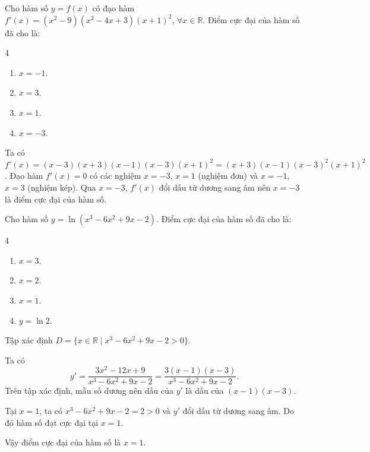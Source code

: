 \begin{baitap}
	Cho hàm số $y = f(x)$ có đạo hàm $f'(x) = (x^2 - 9)(x^2 - 4x + 3)(x + 1)^2$, $\forall x \in \mathbb{R}$. Điểm cực đại của hàm số đã cho là:
	\begin{multicols}{4}
		\begin{enumerate}
			\item $x = -1$.
			\item $x = 3$.
			\item $x = 1$.
			\item $x = -3$.
		\end{enumerate}
	\end{multicols}
	\begin{traloi}
		Ta có $f'(x) = (x - 3)(x + 3)(x - 1)(x - 3)(x + 1)^2 = (x + 3)(x - 1)(x - 3)^2(x + 1)^2$.
		Đạo hàm $f'(x) = 0$ có các nghiệm $x = -3$, $x = 1$ (nghiệm đơn) và $x = -1$, $x = 3$ (nghiệm kép).
		Qua $x = -3$, $f'(x)$ đổi dấu từ dương sang âm nên $x = -3$ là điểm cực đại của hàm số.
	\end{traloi}
	\end{baitap}
\begin{baitap}
	Cho hàm số $y = \ln(x^3 - 6x^2 + 9x - 2)$. Điểm cực đại của hàm số đã cho là:
	\begin{multicols}{4}
		\begin{enumerate}
			\item $x = 3$.
			\item $x = 2$.
			\item $x = 1$.
			\item $y = \ln 2$.
		\end{enumerate}
	\end{multicols}
	\begin{traloi}
		\dapan{C}
		Tập xác định $D=\{x\in\mathbb{R}\mid x^3-6x^2+9x-2>0\}$.
		
		Ta có
		\[
		y'=\frac{3x^2-12x+9}{x^3-6x^2+9x-2}
		=\frac{3(x-1)(x-3)}{x^3-6x^2+9x-2}.
		\]
		Trên tập xác định, mẫu số dương nên dấu của $y'$ là dấu của $(x-1)(x-3)$.
		
		Tại $x=1$, ta có $x^3-6x^2+9x-2=2>0$ và $y'$ đổi dấu từ dương sang âm. Do đó hàm số đạt cực đại tại $x=1$.
		
		Vậy điểm cực đại của hàm số là $x=1$.
	\end{traloi}
\end{baitap}

